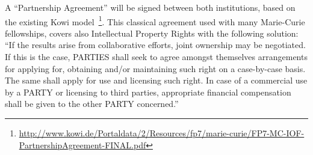 A ``Partnership  Agreement'' will  be signed between  both institutions,
based on the existing Kowi model~\footnote{\url{http://www.kowi.de/Portaldata/2/Resources/fp7/marie-curie/FP7-MC-IOF-PartnershipAgreement-FINAL.pdf}}. This classical  agreement used  with many  Marie-Curie  fellowships, covers
also   Intellectual   Property   Rights   with  the   following
solution: ``If  the  results arise  from  collaborative efforts,  joint
ownership may be  negotiated. If this is the  case, PARTIES shall seek
to agree  amongst themselves arrangements for  applying for, obtaining
and/or maintaining such right on  a case-by-case basis. The same shall
apply for use and licensing such right. In case of a commercial use by
a  PARTY   or  licensing  to  third   parties,  appropriate  financial
compensation shall be given to the other PARTY concerned.''
\begin{table}[h!]
  \begin{Timeplan}
    \hline
    \hline
    \hline
    
    \hline
    \hline
    \hline
    \hline
    
    \hline
    \hline
    \hline
    \hline
    

\end{Timeplan}
\end{table}
